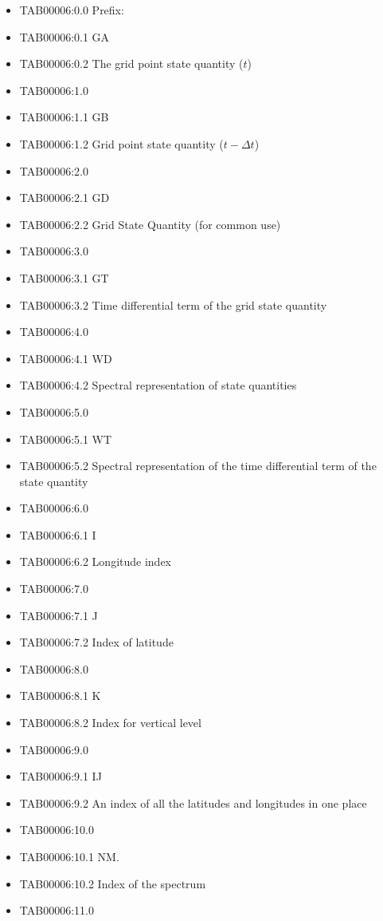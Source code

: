 \begin{itemize}
\item
  TAB00006:0.0 Prefix:
\item
  TAB00006:0.1 GA
\item
  TAB00006:0.2 The grid point state quantity (\(t\))
\item
  TAB00006:1.0
\item
  TAB00006:1.1 GB
\item
  TAB00006:1.2 Grid point state quantity (\(t-\Delta t\))
\item
  TAB00006:2.0
\item
  TAB00006:2.1 GD
\item
  TAB00006:2.2 Grid State Quantity (for common use)
\item
  TAB00006:3.0
\item
  TAB00006:3.1 GT
\item
  TAB00006:3.2 Time differential term of the grid state quantity
\item
  TAB00006:4.0
\item
  TAB00006:4.1 WD
\item
  TAB00006:4.2 Spectral representation of state quantities
\item
  TAB00006:5.0
\item
  TAB00006:5.1 WT
\item
  TAB00006:5.2 Spectral representation of the time differential term of
  the state quantity
\item
  TAB00006:6.0
\item
  TAB00006:6.1 I
\item
  TAB00006:6.2 Longitude index
\item
  TAB00006:7.0
\item
  TAB00006:7.1 J
\item
  TAB00006:7.2 Index of latitude
\item
  TAB00006:8.0
\item
  TAB00006:8.1 K
\item
  TAB00006:8.2 Index for vertical level
\item
  TAB00006:9.0
\item
  TAB00006:9.1 IJ
\item
  TAB00006:9.2 An index of all the latitudes and longitudes in one place
\item
  TAB00006:10.0
\item
  TAB00006:10.1 NM.
\item
  TAB00006:10.2 Index of the spectrum
\item
  TAB00006:11.0

\end{itemize}
